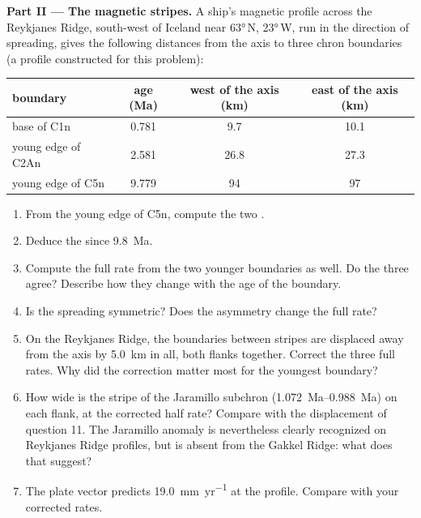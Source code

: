 \begin{problem}
\noindent\textbf{Part II --- The magnetic stripes.}
A ship's magnetic profile across the Reykjanes Ridge, south-west of Iceland near
\ang{63}\,N, \ang{23}\,W, run in the direction of spreading, gives the following
distances from the axis to three chron boundaries (a profile constructed for
this problem):
\begin{center}\small
\begin{tabular}{lccc}
\hline
boundary & age (Ma) & west of the axis (km) & east of the axis (km)\\
\hline
base of C1n & 0.781 & 9.7 & 10.1\\
young edge of C2An & 2.581 & 26.8 & 27.3\\
young edge of C5n & 9.779 & 94 & 97\\
\hline
\end{tabular}
\end{center}
\begin{enumerate}[resume]
  \item From the young edge of C5n, compute the two .
  \item Deduce the  since \qty{9.8}{Ma}.
  \item Compute the full rate from the two younger boundaries as well. Do the
        three agree? Describe how they change with the age of the boundary.
  \item Is the spreading symmetric? Does the asymmetry change the full rate?
  \item On the Reykjanes Ridge, the boundaries between stripes are displaced
        away from the axis by \qty{5.0}{km} in all, both flanks together.
        Correct the three full rates. Why did the correction matter most for
        the youngest boundary?
  \item How wide is the stripe of the Jaramillo subchron
        (\qtyrange{1.072}{0.988}{Ma}) on each flank, at the corrected half
        rate? Compare with the displacement of question 11. The Jaramillo
        anomaly is nevertheless clearly recognized on Reykjanes Ridge
        profiles, but is absent from the Gakkel Ridge: what does that suggest?
  \item The plate vector predicts \qty{19.0}{mm.yr^{-1}} at the profile. Compare
        with your corrected rates.
\end{enumerate}


\end{problem}
